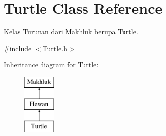\hypertarget{class_turtle}{}\section{Turtle Class Reference}
\label{class_turtle}


Kelas Turunan dari \hyperlink{class_makhluk}{Makhluk} berupa \hyperlink{class_turtle}{Turtle}.  




{\ttfamily \#include $<$Turtle.\+h$>$}

Inheritance diagram for Turtle\+:\begin{figure}[H]
\begin{center}
\leavevmode
\includegraphics[height=3.000000cm]{class_turtle}
\end{center}
\end{figure}
